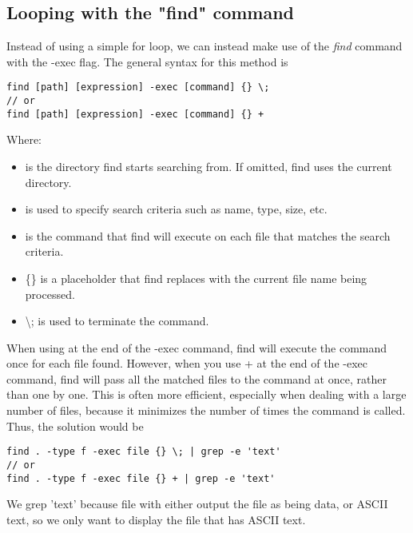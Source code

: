 \documentclass{report}
\begin{document}
    \subsection*{Looping with the "find" command}
    \bigbreak \noindent 
    Instead of using a simple for loop, we can instead make use of the \textit{find} command with the -exec flag. The general syntax for this  method is 
    \bigbreak \noindent 
    \begin{verbatim}
find [path] [expression] -exec [command] {} \;
// or
find [path] [expression] -exec [command] {} +
    \end{verbatim}
    \bigbreak \noindent
    Where:
    \begin{itemize}
        \item \relax [path] is the directory find starts searching from. If omitted, find uses the current directory.
        \item \relax [expression] is used to specify search criteria such as name, type, size, etc.
        \item \relax [command] is the command that find will execute on each file that matches the search criteria.
        \item \relax \{\} is a placeholder that find replaces with the current file name being processed.
        \item \textbackslash; is used to terminate the command.
    \end{itemize}
    \bigbreak \noindent 
    When using \; at the end of the -exec command, find will execute the command once for each file found. However, when you use + at the end of the -exec command, find will pass all the matched files to the command at once, rather than one by one. This is often more efficient, especially when dealing with a large number of files, because it minimizes the number of times the command is called.
    \bigbreak \noindent 
    Thus, the solution would be 
    \bigbreak \noindent 
    \begin{verbatim}
find . -type f -exec file {} \; | grep -e 'text'
// or
find . -type f -exec file {} + | grep -e 'text'
    \end{verbatim}
    \bigbreak \noindent
    We grep 'text' because file with either output the file as being data, or ASCII text, so we only want to display the file that has ASCII text.

    \bigbreak \noindent 
\end{document}
